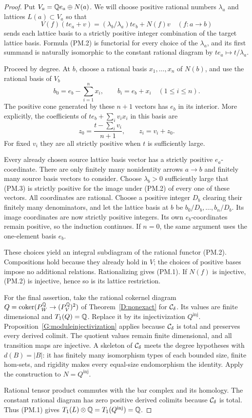 \begin{proof}
Put $V_a=\mathbb Q e_a\oplus N(a)$. We will choose positive rational
numbers $\lambda_a$ and lattices $L(a)\subset V_a$ so that
\[
 V(f)(t e_a+v)=
       (\lambda_b/\lambda_a)t e_b+N(f)v
       \quad(f:a\to b)
 \tag{PM.2}
\]
sends each lattice basis to a strictly positive integer
combination of the target lattice basis. Formula (PM.2) is
functorial for every choice of the $\lambda_a$, and its first
summand is naturally isomorphic to the constant rational
diagram by $t e_a\mapsto t/\lambda_a$.

Proceed by degree. At $b$, choose a rational basis
$x_1,\ldots,x_n$ of $N(b)$, and use the rational basis of $V_b$
\[
 b_0=e_b-\sum_{i=1}^n x_i,\qquad b_i=e_b+x_i
       \quad(1\le i\le n).
\]
The positive cone generated by these $n+1$ vectors has $e_b$
in its interior. More explicitly, the coefficients of
$t e_b+\sum_i v_i x_i$ in this basis are
\[
 z_0=\frac{t-\sum_i v_i}{n+1},\qquad z_i=v_i+z_0.
 \tag{PM.3}
\]
For fixed $v_i$ they are all strictly positive when $t$ is
sufficiently large.

Every already chosen source lattice basis vector has a
strictly positive $e_a$-coordinate. There are only finitely
many nonidentity arrows $a\to b$ and finitely many source
basis vectors to consider. Choose $\lambda_b>0$ sufficiently
large that (PM.3) is strictly positive for the image under
(PM.2) of every one of these vectors. All coordinates are
rational. Choose a positive integer $D_b$ clearing their
finitely many denominators, and let the lattice basis at $b$
be $b_0/D_b,\ldots,b_n/D_b$. Its image coordinates are now
strictly positive integers. Its own $e_b$-coordinates remain
positive, so the induction continues. If $n=0$, the same
argument uses the one-element basis $e_b$.

These choices yield an integral subdiagram of the rational
functor (PM.2). Compositions hold because they already hold
in $V$; the choices of positive bases impose no additional
relations. Rationalizing gives (PM.1). If $N(f)$ is injective,
(PM.2) is injective, hence so is its lattice restriction.

For the final assertion, take the rational cokernel diagram
$Q=\operatorname{coker}(P_W^{\mathbb Q}\to(P_V^{\mathbb Q})^2)$ of
Theorem~\ref{D:nonexact} for $\mathcal C_\delta$. Its values are finite
dimensional and $T_1(Q)=\mathbb Q$. Replace it by its injectivization
$Q^{\mathrm{inj}}$. Proposition~\ref{G:moduleinjectivization}
applies because $\mathcal C_\delta$ is total and preserves every derived
colimit. The quotient values remain finite dimensional, and
all transition maps are injective. A skeleton of $\mathcal C_\delta$
meets the degree hypotheses with $d(B)=|B|$: it has finitely
many isomorphism types of each bounded size, finite hom-sets,
and rigidity makes every equal-size endomorphism the identity.
Apply the construction to $N=Q^{\mathrm{inj}}$.

Rational tensor product commutes with the bar complex and
its homology. The constant rational diagram has zero positive
derived colimits because $\mathcal C_\delta$ is total. Thus (PM.1)
gives $T_1(L)\otimes\mathbb Q=T_1(Q^{\mathrm{inj}})=\mathbb Q$.
\end{proof}

